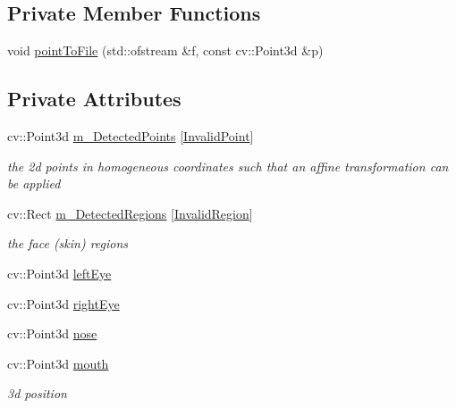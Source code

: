 \subsection*{Private Member Functions}
\begin{DoxyCompactItemize}
\item 
void \hyperlink{class_face3_d_1_1_face_geometry_adfb84290b1363a7f37c785640464bc42}{point\+To\+File} (std\+::ofstream \&f, const cv\+::\+Point3d \&p)
\end{DoxyCompactItemize}
\subsection*{Private Attributes}
\begin{DoxyCompactItemize}
\item 
cv\+::\+Point3d \hyperlink{class_face3_d_1_1_face_geometry_a695d2f7b17ed80f56f4e6af44c796a9a}{m\+\_\+\+Detected\+Points} \mbox{[}\hyperlink{class_face3_d_1_1_face_geometry_aab597f00966010882927a4974649bf11aef08736c0cf92fe26e5d281571ac319d}{Invalid\+Point}\mbox{]}
\begin{DoxyCompactList}\small\item\em the 2d points in homogeneous coordinates such that an affine transformation can be applied \end{DoxyCompactList}\item 
cv\+::\+Rect \hyperlink{class_face3_d_1_1_face_geometry_a41bdb9ec230523b1bc19bc8f7f2b48ea}{m\+\_\+\+Detected\+Regions} \mbox{[}\hyperlink{class_face3_d_1_1_face_geometry_a6db32685a7f429d507b8e31f7c42fe77ac1c1cfae295c068738737d0bdbd3cb78}{Invalid\+Region}\mbox{]}
\begin{DoxyCompactList}\small\item\em the face (skin) regions \end{DoxyCompactList}\item 
cv\+::\+Point3d \hyperlink{class_face3_d_1_1_face_geometry_a67446b08935c867d465743452d674f71}{left\+Eye}
\item 
cv\+::\+Point3d \hyperlink{class_face3_d_1_1_face_geometry_a2843e84aaa697a4cd418d1940378955b}{right\+Eye}
\item 
cv\+::\+Point3d \hyperlink{class_face3_d_1_1_face_geometry_a51b5cf29a6deac13aad7ab3ba3858eca}{nose}
\item 
cv\+::\+Point3d \hyperlink{class_face3_d_1_1_face_geometry_a1c36fe81650a276b523d8dc17b30038e}{mouth}
\begin{DoxyCompactList}\small\item\em 3d position \end{DoxyCompactList}\item 

\end{DoxyCompactItemize}
